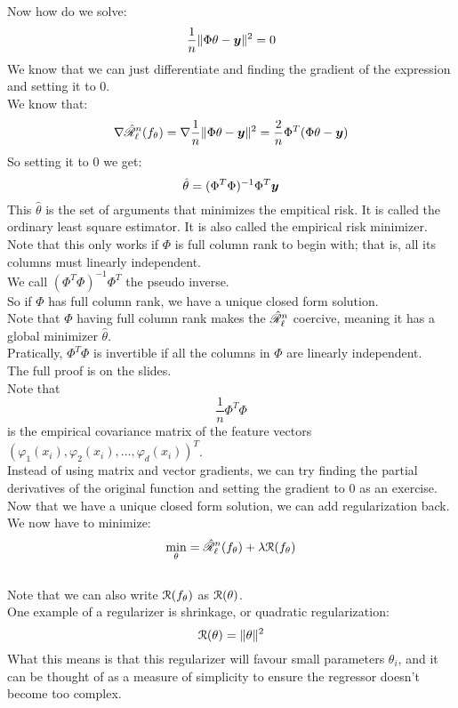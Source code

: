 \documentclass[12pt]{article}
\begin{document}
Now how do we solve:
\[ \dfrac{1}{n}\|\Phi \theta - \boldsymbol{y}\|^2 = 0 \]
We know that we can just differentiate and finding
the gradient of the expression and setting
it to $0$. \\
We know that:
\[ \nabla \hat{\mathscr{R}}_{\ell}^{n}(f_{\theta}) 
= \nabla \dfrac{1}{n}
\|\Phi \theta - \boldsymbol{y}\|^2 
= \dfrac{2}{n}\Phi^T(\Phi \theta - \boldsymbol{y}) \]
So setting it to $0$ we get:
\[ \hat{\theta} = (\Phi^T\Phi)^{-1} \Phi^T 
\boldsymbol{y} \]
This $\hat{\theta}$ is the set of arguments
that minimizes the empitical risk.
It is called the ordinary least square
estimator.
It is also called the empirical risk minimizer. \\
Note that this only works if $\Phi$
is full column rank to begin with;
that is, all its columns must linearly
independent. \\
We call $(\Phi^T\Phi)^{-1} \Phi^T$
the pseudo inverse. \\

So if $\Phi$ has full column rank,
we have a unique closed form solution. \\
Note that $\Phi$ having full column rank
makes the $\hat{\mathscr{R}}_{\ell}^{n}$
coercive, meaning it has a global minimizer
$\hat{\theta}$. \\
Pratically, $\Phi^T\Phi$ is invertible
if all the columns in $\Phi$
are linearly independent. \\
The full proof is on the slides. \\

Note that 
\[ \dfrac{1}{n}\Phi^T\Phi \] 
is the empirical covariance matrix of the feature
vectors $(\varphi_1(x_i), \varphi_2(x_i),
\dots, \varphi_d(x_i))^T$. \\

Instead of using matrix and vector gradients,
we can try finding the partial derivatives
of the original function and setting the gradient
to $0$ as an exercise. \\

Now that we have a unique closed form solution,
we can add regularization back. \\

We now have to minimize:
\[ \min_{\theta} = \hat{\mathscr{R}}_{\ell}^{n}(f_\theta)
+ \lambda \mathcal{R}(f_\theta) \] \\
Note that we can also write $\mathcal{R}(f_\theta)$
as $\mathcal{R}(\theta)$. \\

One example of a regularizer is shrinkage,
or quadratic regularization:
\[ \mathcal{R}(\theta) = \|\theta\|^2 \]
What this means is that this regularizer
will favour small parameters $\theta_i$,
and it can be thought of as a measure of
simplicity to ensure the regressor doesn't
become too complex. \\
\end{document}
